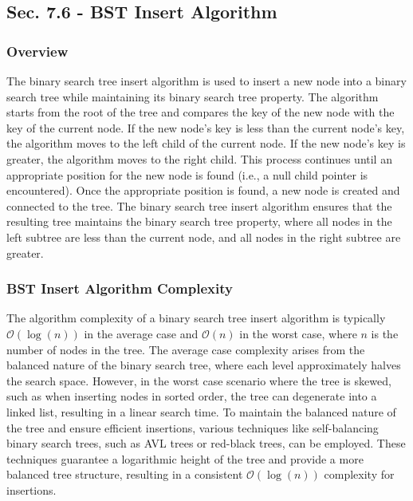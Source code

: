 \subsection*{Sec. 7.6 - BST Insert Algorithm}

\subsubsection{Overview}

The binary search tree insert algorithm is used to insert a new node into a binary search tree while maintaining its binary search tree property. The algorithm starts from the root of the tree and compares the key of the new node with the key of the current node. If the new node's key is less than the current node's key, the algorithm 
moves to the left child of the current node. If the new node's key is greater, the algorithm moves to the right child. This process continues until an appropriate position for the new node is found (i.e., a null child pointer is encountered). Once the appropriate position is found, a new node is created and connected to the tree. The binary 
search tree insert algorithm ensures that the resulting tree maintains the binary search tree property, where all nodes in the left subtree are less than the current node, and all nodes in the right subtree are greater.

\subsubsection{BST Insert Algorithm Complexity}

The algorithm complexity of a binary search tree insert algorithm is typically $\mathcal{O}(\log{(n)})$ in the average case and $\mathcal{O}(n)$ in the worst case, where $n$ is the number of nodes in the tree. The average case complexity arises from the balanced nature of the binary search tree, where each level approximately halves the search space. However, 
in the worst case scenario where the tree is skewed, such as when inserting nodes in sorted order, the tree can degenerate into a linked list, resulting in a linear search time. To maintain the balanced nature of 
the tree and ensure efficient insertions, various techniques like self-balancing binary search trees, such as AVL trees or red-black trees, can be employed. These techniques guarantee a logarithmic height of the tree and provide a more balanced tree structure, resulting in a consistent $\mathcal{O}(\log{(n)})$ complexity for insertions.

